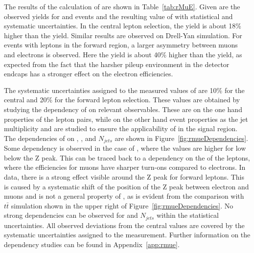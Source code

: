 The results of the calculation of \rmue are shown in Table~\ref{tab:rMuE}. Given are the observed yields for \MM and \EE events and the resulting value of \rmue with statistical and systematic uncertainties. In the central lepton selection, the \MM yield is about 18\% higher than the \EE yield. Similar results are observed on Drell-Yan simulation. For events with leptons in the forward region, a larger asymmetry between muons and electrons is observed. Here the \MM yield is about 40\% higher than the \EE yield, as expected from the fact that the harsher pileup environment in the detector endcaps has a stronger effect on the electron efficiencies. 

The systematic uncertainties assigned to the measured values of \rmue are 10\% for the central and 20\% for the forward lepton selection. These values are obtained by studying the dependency of \rmue on relevant observables. These are on the one hand properties of the lepton pairs, while on the other hand event properties as the jet multiplicity and \MET are studied to ensure the applicability of \rmue in the signal region. The dependencies of \rmue on \mll, \MET, and $N_{jets}$ are shown in Figure~\ref{fig:rmueDependencies}. Some dependency is observed in the case of \mll, where the values are higher for low \mll below the Z peak. This can be traced back to a dependency on the \pt of the leptons, where the efficiencies for muons have sharper turn-ons compared to electrons. In data, there is a strong effect visible around the Z peak for forward leptons. This is caused by a systematic shift of the position of the Z peak between electron and muons and is not a general property of \rmue, as is evident from the comparison with $t\bar{t}$ simulation shown in the upper right of Figure~\ref{fig:rmueDependencies}. No strong dependencies can be observed for \MET and $N_{jets}$ within the statistical uncertainties. All observed deviations from the central values are covered by the systematic uncertainties assigned to the measurement. Further information on the dependency studies can be found in Appendix~\ref{app:rmue}.
